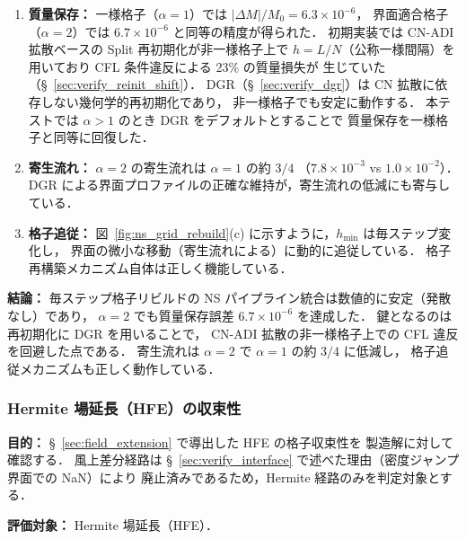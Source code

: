 \begin{enumerate}[noitemsep]
  \item \textbf{質量保存：}
        一様格子（$\alpha = 1$）では $|\Delta M|/M_0 = 6.3 \times 10^{-6}$，
        界面適合格子（$\alpha = 2$）では $6.7 \times 10^{-6}$ と同等の精度が得られた．
        初期実装では CN-ADI 拡散ベースの Split 再初期化が非一様格子上で
        $h = L/N$（公称一様間隔）を用いており CFL 条件違反による 23\% の質量損失が
        生じていた（§~\ref{sec:verify_reinit_shift}）．
        DGR（§~\ref{sec:verify_dgr}）は CN 拡散に依存しない幾何学的再初期化であり，
        非一様格子でも安定に動作する．
        本テストでは $\alpha > 1$ のとき DGR をデフォルトとすることで
        質量保存を一様格子と同等に回復した．
  \item \textbf{寄生流れ：}
        $\alpha = 2$ の寄生流れは $\alpha = 1$ の約 $3/4$
        （$7.8 \times 10^{-3}$ vs $1.0 \times 10^{-2}$）．
        DGR による界面プロファイルの正確な維持が，寄生流れの低減にも寄与している．
  \item \textbf{格子追従：}
        図~\ref{fig:ns_grid_rebuild}(c) に示すように，$h_{\min}$ は毎ステップ変化し，
        界面の微小な移動（寄生流れによる）に動的に追従している．
        格子再構築メカニズム自体は正しく機能している．
\end{enumerate}

\noindent\textbf{結論：}
毎ステップ格子リビルドの NS パイプライン統合は数値的に安定（発散なし）であり，
$\alpha = 2$ でも質量保存誤差 $6.7 \times 10^{-6}$ を達成した．
鍵となるのは再初期化に DGR を用いることで，
CN-ADI 拡散の非一様格子上での CFL 違反を回避した点である．
寄生流れは $\alpha = 2$ で $\alpha = 1$ の約 $3/4$ に低減し，
格子追従メカニズムも正しく動作している．


\subsubsection{Hermite 場延長（HFE）の収束性}
\label{sec:verify_field_extension}%
\label{sec:verify_gfm}%

\noindent\textbf{目的：}
§~\ref{sec:field_extension} で導出した HFE の格子収束性を
製造解に対して確認する．
風上差分経路は §~\ref{sec:verify_interface} で述べた理由（密度ジャンプ界面での NaN）により
廃止済みであるため，Hermite 経路のみを判定対象とする．

\noindent\textbf{評価対象：}
Hermite 場延長（HFE）．

